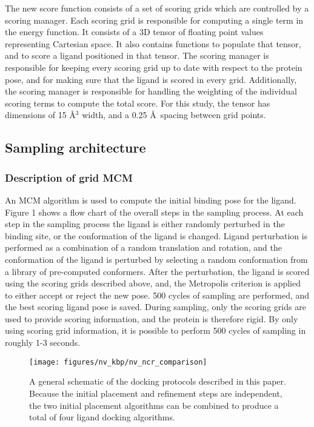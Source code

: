 The new score function consists of a set of scoring grids which are controlled by a scoring manager.
Each scoring grid is responsible for computing a single term in the energy function.
It consists of a 3D tensor of floating point values representing Cartesian space.
It also contains functions to populate that tensor, and to score a ligand positioned in that tensor.
The scoring manager is responsible for keeping every scoring grid up to date with respect to the protein pose, and for making sure that the ligand is scored in every grid.
Additionally, the scoring manager is responsible for handling the weighting of the individual scoring terms to compute the total score.
For this study, the tensor has dimensions of 15 \AA$^{3}$ width, and a 0.25 \AA\ spacing between grid points. 

\subsection{Sampling architecture}
\subsubsection{Description of grid MCM}
An MCM algorithm is used to compute the initial binding pose for the ligand.
Figure 1 shows a flow chart of the overall steps in the sampling process.
At each step in the sampling process the ligand is either randomly perturbed in the binding site, or the conformation of the ligand is changed.
Ligand perturbation is performed as a combination of a random translation and rotation, and the conformation of the ligand is perturbed by selecting a random conformation from a library of pre-computed conformers.
After the perturbation, the ligand is scored using the scoring grids described above, and, the Metropolis criterion is applied to either accept or reject the new pose.
500 cycles of sampling are performed, and the best scoring ligand pose is saved.
During sampling, only the scoring grids are used to provide scoring information, and the protein is therefore rigid.
By only using scoring grid information, it is possible to perform 500 cycles of sampling in roughly 1-3 seconds.

\begin{figure}
\centering
\texttt{[image: figures/nv\_kbp/nv\_ncr\_comparison]}
\caption{
A general schematic of the docking protocols described in this paper.
Because the initial placement and refinement steps are independent, the two initial placement algorithms can be combined to produce a total of four ligand docking algorithms.  
}
\label{fig:docking_flowchart}
\end{figure}

